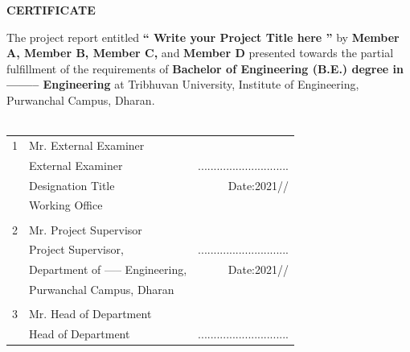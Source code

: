 \documentclass[a4paper, 12pt ]{report}
\begin{document}
	\newpage
	\cleardoublepage
	\setcounter{page}{3}
	\begin{center}\fontsize{18}{0} \textbf{CERTIFICATE}\end{center}
	\vspace*{\baselineskip}
	{ The project report entitled {\bf `` Write your Project Title here ”}  by {\bf Member A, Member B, Member C,} and {\bf Member D} presented towards the partial fulfillment of the requirements of {\bf Bachelor of Engineering (B.E.) degree in -------- Engineering } at Tribhuvan University, Institute of Engineering, Purwanchal Campus, Dharan. }
	\\
	\\
	{
	\begin{flushright}
		\begin{tabular}{llr}
			1 & Mr. External Examiner                      &                         \\
		& External Examiner                & \hspace{30pt} ............................. \\
		& Designation Title                & Date:2021/\hspace{15pt}/\hspace{15pt}          \\
		& Working Office                   &                         \\
		&                                  &                         \\
		2 & Mr. Project Supervisor                       &                         \\
		& Project Supervisor,              &\hspace{30pt} ............................. \\
		& Department of ----- Engineering, & Date:2021/\hspace{15pt}/\hspace{15pt}           \\
		& Purwanchal Campus, Dharan        &                         \\
		&                                  &                         \\
		3 & Mr. Head of Department                         &                         \\
		& Head of Department               &\hspace{30pt} ............................. \\

\end{tabular}
\end{flushright}}
\end{document}
